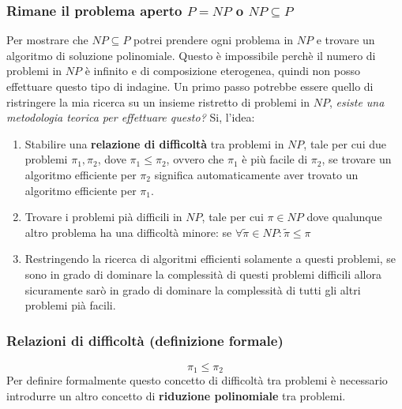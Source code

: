 \documentclass{article}
\begin{document}
\subsubsection{Rimane il problema aperto $P=NP$ o $NP\subseteq P$}
Per mostrare che $NP\subseteq P$ potrei prendere ogni problema in $NP$ e trovare
un algoritmo di soluzione polinomiale. Questo è impossibile perchè il numero
di problemi in $NP$ è infinito e di composizione eterogenea, quindi non posso effettuare
questo tipo di indagine.
\newline\newline
Un primo passo potrebbe essere quello di ristringere la mia ricerca su un insieme ristretto
di problemi in $NP$, \textit{esiste una metodologia teorica per effettuare questo?} Si,
l'idea:
\begin{enumerate}
    \item Stabilire una \textbf{relazione di difficoltà} tra problemi in $NP$, tale
          per cui due problemi $\pi_1,\pi_2$, dove $\pi_1\leq\pi_2$, ovvero che $\pi_1$ è
          più facile di $\pi_2$, se trovare un algoritmo efficiente per $\pi_2$ significa
          automaticamente aver trovato un algoritmo efficiente per $\pi_1$.

    \item Trovare i problemi pià difficili in $NP$, tale per cui $\pi\in NP$
          dove qualunque altro problema ha una difficoltà minore: se $\forall\tilde{\pi}\in NP:\tilde{\pi}\leq\pi$

    \item Restringendo la ricerca di algoritmi efficienti solamente a questi problemi, se sono
          in grado di dominare la complessità di questi problemi difficili allora sicuramente
          sarò in grado di dominare la complessità di tutti gli altri problemi pià facili.
\end{enumerate}

\subsubsection{Relazioni di difficoltà (definizione formale)}
$$\pi_1\leq\pi_2$$
Per definire formalmente questo concetto di difficoltà tra problemi è necessario introdurre
un altro concetto di \textbf{riduzione polinomiale} tra problemi.
\end{document}
